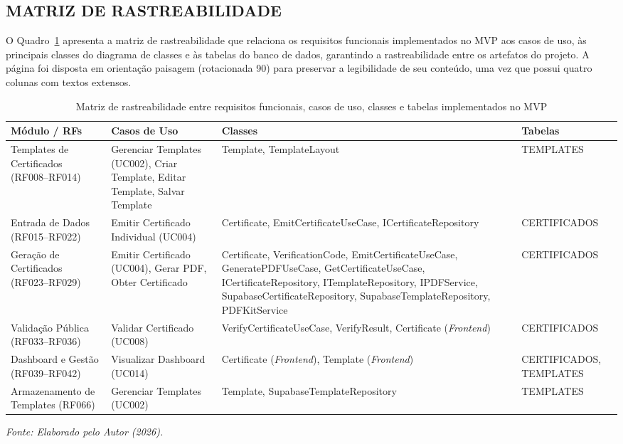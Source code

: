 \subsection{MATRIZ DE RASTREABILIDADE}

O Quadro~\ref{qua:rastreabilidade} apresenta a matriz de rastreabilidade que relaciona os requisitos funcionais implementados no MVP aos casos de uso, às principais classes do diagrama de classes e às tabelas do banco de dados, garantindo a rastreabilidade entre os artefatos do projeto. A página foi disposta em orientação paisagem (rotacionada 90\textdegree) para preservar a legibilidade de seu conteúdo, uma vez que possui quatro colunas com textos extensos.

\clearpage
\thispagestyle{landscape}
\begin{landscape}
\begingroup
\renewcommand{\tablename}{Quadro}
\begin{table}[H]
\centering
\footnotesize
\captionsetup{type=quadro}
\caption{Matriz de rastreabilidade entre requisitos funcionais, casos de uso, classes e tabelas implementados no MVP}
\label{qua:rastreabilidade}
\setlength{\tabcolsep}{2pt}
\renewcommand{\arraystretch}{0.85}
\begin{tabularx}{\linewidth}{|>{\raggedright\arraybackslash}X|>{\raggedright\arraybackslash}X|>{\raggedright\arraybackslash}X|>{\raggedright\arraybackslash}X|}
\hline
\textbf{Módulo / RFs} & \textbf{Casos de Uso} & \textbf{Classes} & \textbf{Tabelas} \\
\hline
Templates de Certificados (RF008–RF014) & Gerenciar Templates (UC002), Criar Template, Editar Template, Salvar Template & Template, TemplateLayout & TEMPLATES \\
\hline
Entrada de Dados (RF015–RF022) & Emitir Certificado Individual (UC004) & Certificate, EmitCertificateUseCase, ICertificateRepository & CERTIFICADOS \\
\hline
Geração de Certificados (RF023–RF029) & Emitir Certificado (UC004), Gerar PDF, Obter Certificado & Certificate, VerificationCode, EmitCertificateUseCase, GeneratePDFUseCase, GetCertificateUseCase, ICertificateRepository, ITemplateRepository, IPDFService, SupabaseCertificateRepository, SupabaseTemplateRepository, PDFKitService & CERTIFICADOS \\
\hline
Validação Pública (RF033–RF036) & Validar Certificado (UC008) & VerifyCertificateUseCase, VerifyResult, Certificate (\textit{Frontend}) & CERTIFICADOS \\
\hline
Dashboard e Gestão (RF039–RF042) & Visualizar Dashboard (UC014) & Certificate (\textit{Frontend}), Template (\textit{Frontend}) & CERTIFICADOS, TEMPLATES \\
\hline
Armazenamento de Templates (RF066) & Gerenciar Templates (UC002) & Template, SupabaseTemplateRepository & TEMPLATES \\
\hline
\end{tabularx}
\end{table}
\par\vspace{4pt}
\endgroup
\noindent\raggedright\small\textit{Fonte: Elaborado pelo Autor (2026).}
\end{landscape}
\clearpage
